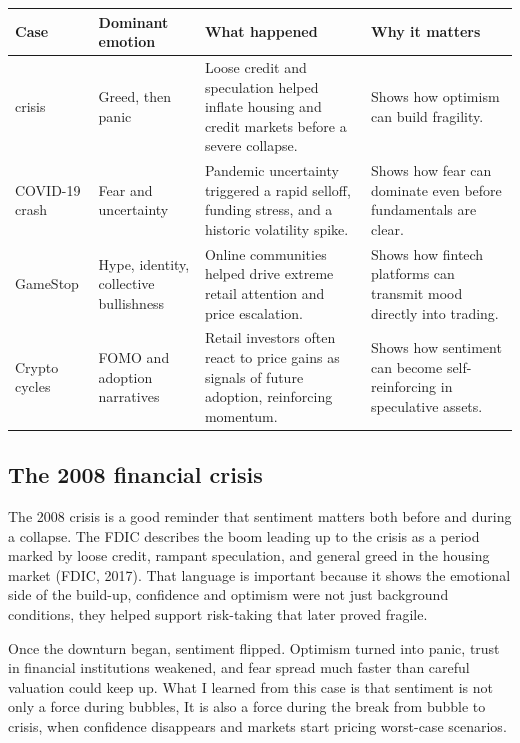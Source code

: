 \documentclass[12pt]{article}
\begin{document}
\begin{tabularx}{\textwidth}{|>{\raggedright\arraybackslash}p{}|>{\raggedright\arraybackslash}p{}|>{\raggedright\arraybackslash}p{}|X|}
\hline
\textbf{Case} & \textbf{Dominant emotion} & \textbf{What happened} & \textbf{Why it matters} \\
\hline
2008 crisis & Greed, then panic & Loose credit and speculation helped inflate housing and credit markets before a severe collapse. & Shows how optimism can build fragility. \\
\hline
COVID-19 crash & Fear and uncertainty & Pandemic uncertainty triggered a rapid selloff, funding stress, and a historic volatility spike. & Shows how fear can dominate even before fundamentals are clear. \\
\hline
GameStop & Hype, identity, collective bullishness & Online communities helped drive extreme retail attention and price escalation. & Shows how fintech platforms can transmit mood directly into trading. \\
\hline
Crypto cycles & FOMO and adoption narratives & Retail investors often react to price gains as signals of future adoption, reinforcing momentum. & Shows how sentiment can become self-reinforcing in speculative assets. \\
\hline
\end{tabularx}

\subsection{The 2008 financial crisis}

The 2008 crisis is a good reminder that sentiment matters both before and during a collapse. The FDIC describes the boom leading up to the crisis as a period marked by loose credit, rampant speculation, and general greed in the housing market (FDIC, 2017). That language is important because it shows the emotional side of the build-up, confidence and optimism were not just background conditions, they helped support risk-taking that later proved fragile.

Once the downturn began, sentiment flipped. Optimism turned into panic, trust in financial institutions weakened, and fear spread much faster than careful valuation could keep up. What I learned from this case is that sentiment is not only a force during bubbles, It is also a force during the break from bubble to crisis, when confidence disappears and markets start pricing worst-case scenarios.
\end{document}
